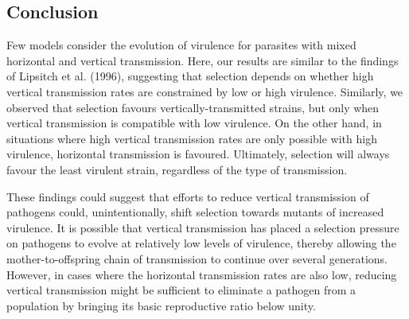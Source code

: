 \subsection{Conclusion}
Few models consider the evolution of virulence for parasites with mixed
horizontal and vertical transmission. Here, our results are similar to the
findings of Lipsitch et al. (1996)\supercite{Lipsitch:1996}, suggesting that
selection depends on whether high vertical transmission rates are constrained
by low or high virulence. Similarly, we observed that selection favours
vertically-transmitted strains, but only when vertical transmission is
compatible with low virulence. On the other hand, in situations where high
vertical transmission rates are only possible with high virulence, horizontal
transmission is favoured. Ultimately, selection will always favour the least
virulent strain, regardless of the type of transmission.

These findings could suggest that efforts to reduce vertical transmission of
pathogens could, unintentionally, shift selection towards mutants of increased
virulence. It is possible that vertical transmission has placed a selection
pressure on pathogens to evolve at relatively low levels of virulence, thereby
allowing the mother-to-offspring chain of transmission to continue over several
generations. However, in cases where the horizontal transmission rates are also
low, reducing vertical transmission might be sufficient to eliminate a pathogen
from a population by bringing its basic reproductive ratio below unity.

